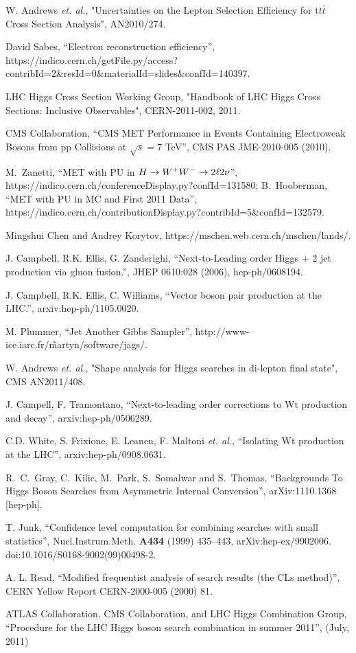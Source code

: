 W. Andrews {\it et. al.}, "Uncertainties on the Lepton Selection Efficiency for t$t\bar{t}$ Cross Section Analysis", AN2010/274.

David Sabes, ``Electron reconstruction efficiency'', \\
{\small https://indico.cern.ch/getFile.py/access?contribId=2\&resId=0\&materialId=slides\&confId=140397}.

LHC Higgs Cross Section Working Group, "Handbook of LHC Higgs Cross Sections: 
Inclusive Observables", CERN-2011-002, 2011.

CMS Collaboration, ``CMS MET Performance in Events Containing Electroweak Bosons from pp Collisions at $\sqrt{s}=7$ TeV'', CMS PAS JME-2010-005 (2010).

M.~Zanetti, ``MET with PU in $H\to W^+W^- \to 2\ell 2\nu$'', \\
https://indico.cern.ch/conferenceDisplay.py?confId=131580; 
B.~Hooberman, ``MET with PU in MC and First 2011 Data'', https://indico.cern.ch/contributionDisplay.py?contribId=5\&confId=132579. 


Mingshui Chen and Andrey Korytov, https://mschen.web.cern.ch/mschen/lands/.

J. Campbell, R.K. Ellis, G. Zanderighi, ``Next-to-Leading order Higgs + 2 jet production via gluon fusion.'', JHEP 0610:028 (2006), hep-ph/0608194.

J. Campbell, R.K. Ellis, C. Williams, ``Vector boson pair production at the LHC.'', arxiv:hep-ph/1105.0020.

M. Plummer, ``Jet Another Gibbs Sampler'', http://www-ice.iarc.fr/\~martyn/software/jags/.

W. Andrews {\it et. al.}, "Shape analysis for Higgs searches in di-lepton final state", 
CMS AN2011/408.

J. Campell, F. Tramontano, ``Next-to-leading order corrections to Wt production and decay'', arxiv:hep-ph/0506289.

C.D. White, S. Frixione, E. Leanen, F. Maltoni {\it et. al.}, ``Isolating Wt production at the LHC'', arxiv:hep-ph/0908.0631.

  R.~C.~Gray, C.~Kilic, M.~Park, S.~Somalwar and S.~Thomas,
  ``Backgrounds To Higgs Boson Searches from Asymmetric Internal Conversion'',
  arXiv:1110.1368 [hep-ph].

T. Junk, ``Confidence level computation for combining searches with small statistics'', 
Nucl.Instrum.Meth. {\bf A434} (1999) 435–443, arXiv:hep-ex/9902006. 
doi:10.1016/S0168-9002(99)00498-2.

A. L. Read, ``Modified frequentist analysis of search results (the CLs method)'', 
CERN Yellow Report CERN-2000-005 (2000) 81.

ATLAS Collaboration, CMS Collaboration, and LHC Higgs Combination Group, 
``Procedure for the LHC Higgs boson search combination in summer 2011'', (July, 2011)

